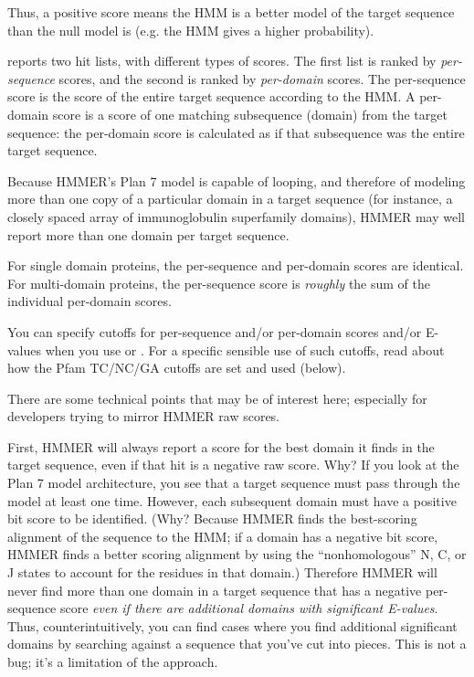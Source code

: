 \begin{itemize}
Thus, a positive score means the HMM is a better model of the target
sequence than the null model is (e.g. the HMM gives a higher
probability).

 reports two hit lists, with different types of
scores. The first list is ranked by {\em per-sequence} scores, and the
second is ranked by {\em per-domain} scores. The per-sequence score is
the score of the entire target sequence according to the HMM. A
per-domain score is a score of one matching subsequence (domain) from
the target sequence: the per-domain score is calculated as if that
subsequence was the entire target sequence. 

Because HMMER's Plan 7 model is capable of looping, and therefore of
modeling more than one copy of a particular domain in a target
sequence (for instance, a closely spaced array of immunoglobulin
superfamily domains), HMMER may well report more than one domain per
target sequence.

For single domain proteins, the per-sequence and per-domain scores are
identical. For multi-domain proteins, the per-sequence score is {\em
roughly} the sum of the individual per-domain scores. 

You can specify cutoffs for per-sequence and/or per-domain scores
and/or E-values when you use  or .  For
a specific sensible use of such cutoffs, read about how the Pfam
TC/NC/GA cutoffs are set and used (below).

There are some technical points that may be of interest here;
especially for developers trying to mirror HMMER raw scores.

First, HMMER will always report a score for the best domain it finds
in the target sequence, even if that hit is a negative raw score. Why?
If you look at the Plan 7 model architecture, you see that a target
sequence must pass through the model at least one time. However, each
subsequent domain must have a positive bit score to be identified.
(Why? Because HMMER finds the best-scoring alignment of the sequence
to the HMM; if a domain has a negative bit score, HMMER finds a better
scoring alignment by using the ``nonhomologous'' N, C, or J states to
account for the residues in that domain.) Therefore HMMER will never
find more than one domain in a target sequence that has a negative
per-sequence score \textit{even if there are additional domains with
significant E-values}. Thus, counterintuitively, you can find cases
where you find additional significant domains by searching against a
sequence that you've cut into pieces. This is not a bug; it's a
limitation of the approach.


\end{itemize}

